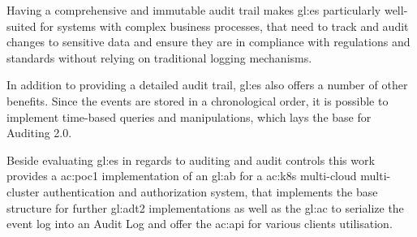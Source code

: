 Having a comprehensive and immutable audit trail makes \gls{gl:es} particularly well-suited for systems with complex business processes, that need to track and audit changes to sensitive data and ensure they are in compliance with regulations and standards without relying on traditional logging mechanisms.

In addition to providing a detailed audit trail, \gls{gl:es} also offers a number of other benefits. Since the events are stored in a chronological order, it is possible to implement time-based queries and manipulations, which lays the base for Auditing 2.0.

Beside evaluating \gls{gl:es} in regards to auditing and audit controls this work provides a \gls{ac:poc1} implementation of an \gls{gl:ab} for a \gls{ac:k8s} multi-cloud multi-cluster authentication and authorization system, that implements the base structure for further \gls{gl:adt2} implementations as well as the \gls{gl:ac} to serialize the event log into an Audit Log and offer the \gls{ac:api} for various clients utilisation.
